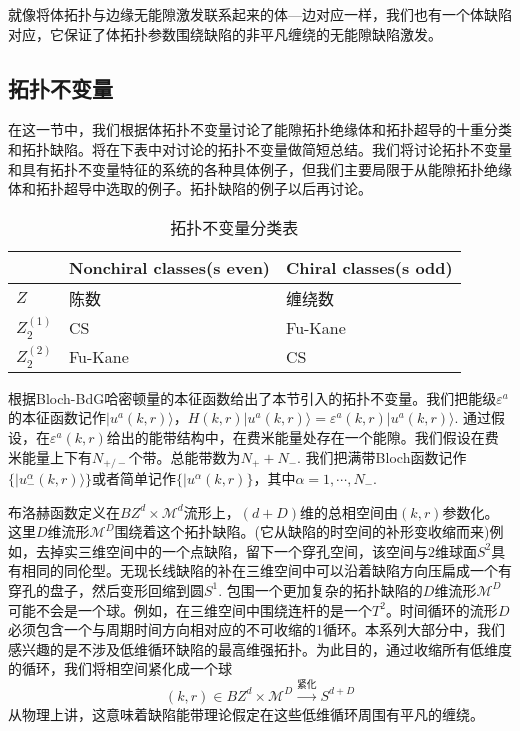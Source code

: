 \documentclass[a4paper]{article}
\numberwithin{equation}{subsection}
\newcommand{\mM}{\mathcal{M}}
\begin{document}
就像将体拓扑与边缘无能隙激发联系起来的体—边对应一样，我们也有一个体缺陷对应，它保证了体拓扑参数围绕缺陷的非平凡缠绕的无能隙缺陷激发。

\subsection{拓扑不变量}
在这一节中，我们根据体拓扑不变量讨论了能隙拓扑绝缘体和拓扑超导的十重分类和拓扑缺陷。将在下表中对讨论的拓扑不变量做简短总结。我们将讨论拓扑不变量和具有拓扑不变量特征的系统的各种具体例子，但我们主要局限于从能隙拓扑绝缘体和拓扑超导中选取的例子。拓扑缺陷的例子以后再讨论。

\begin{table}[h]
    \centering
    \begin{tabular}{|l|l|l|}
    \hline
                & Nonchiral classes(s even) & Chiral classes(s odd) \\ \hline
    $Z$         & 陈数                        & 缠绕数                   \\ \hline
    $Z_2^{(1)}$ & CS                        & Fu-Kane               \\ \hline
    $Z_2^{(2)}$ & Fu-Kane                   & CS                    \\ \hline
    \end{tabular}
    \caption{拓扑不变量分类表}
\end{table}

根据Bloch-BdG哈密顿量的本征函数给出了本节引入的拓扑不变量。我们把能级$\varepsilon^a$的本征函数记作$|u^a(k,r)\rangle$，$H(k,r)|u^a(k,r)\rangle=\varepsilon^a(k,r)|u^a(k,r)\rangle$. 通过假设，在$\varepsilon^a(k,r)$给出的能带结构中，在费米能量处存在一个能隙。我们假设在费米能量上下有$N_{+/-}$个带。总能带数为$N_++N_-$. 我们把满带Bloch函数记作$\{|u_-^\alpha(k,r)\rangle\}$或者简单记作$\{|u^\alpha(k,r)\}$，其中$\alpha=1,\cdots,N_-$.

布洛赫函数定义在$BZ^d\times\mathcal{M}^d$流形上，$(d+D)$维的总相空间由$(k,r)$参数化。这里$D$维流形$\mathcal{M}^D$围绕着这个拓扑缺陷。(它从缺陷的时空间的补形变收缩而来)例如，去掉实三维空间中的一个点缺陷，留下一个穿孔空间，该空间与$2$维球面$S^2$具有相同的同伦型。无现长线缺陷的补在三维空间中可以沿着缺陷方向压扁成一个有穿孔的盘子，然后变形回缩到圆$S^1$. 包围一个更加复杂的拓扑缺陷的$D$维流形$\mM^D$可能不会是一个球。例如，在三维空间中围绕连杆的是一个$T^2$。时间循环的流形$D$必须包含一个与周期时间方向相对应的不可收缩的1循环。本系列大部分中，我们感兴趣的是不涉及低维循环缺陷的最高维强拓扑。为此目的，通过收缩所有低维度的循环，我们将相空间紧化成一个球
\begin{equation*}
    (k,r)\in BZ^d\times\mM^D\xrightarrow{\text{紧化}}S^{d+D}
\end{equation*}
从物理上讲，这意味着缺陷能带理论假定在这些低维循环周围有平凡的缠绕。
\end{document}
